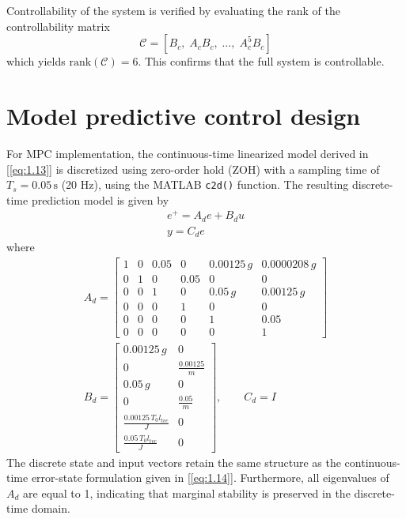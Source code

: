 \documentclass[10pt,twocolumn,twoside]{IEEEtran}
\begin{document}
Controllability of the system is verified by evaluating the rank of the controllability matrix
\begin{equation}
    \mathcal{C} = [B_c,\; A_c B_c,\; \ldots,\; A_c^5 B_c]
\end{equation}
which yields $\mathrm{rank}(\mathcal{C}) = 6$. This confirms that the full system is controllable.

\section{Model predictive control design}
For MPC implementation, the continuous-time linearized model derived in [\ref{eq:1.13}] is discretized using zero-order hold (ZOH) with a sampling time of $T_s = 0.05\,\mathrm{s}$ (20 Hz), using the MATLAB \texttt{c2d()} function. The resulting discrete-time prediction model is given by
\begin{equation}
    \begin{gathered}
        e^{+} = A_d e + B_d u \\
        y = C_d e
    \end{gathered}
    \label{eq:2.1}
\end{equation}
where
\begin{equation}
    \begin{gathered}
         A_d =
        \begin{bmatrix}
        1 & 0 & 0.05 & 0 & 0.00125\,g & 0.0000208\,g \\
        0 & 1 & 0 & 0.05 & 0 & 0 \\
        0 & 0 & 1 & 0 & 0.05\,g & 0.00125\,g \\
        0 & 0 & 0 & 1 & 0 & 0 \\
        0 & 0 & 0 & 0 & 1 & 0.05 \\
        0 & 0 & 0 & 0 & 0 & 1
        \end{bmatrix}\\
        B_d =
        \begin{bmatrix}
        0.00125\,g & 0 \\
        0 & \frac{0.00125}{m} \\
        0.05\,g & 0 \\
        0 & \frac{0.05}{m} \\
        \frac{0.00125\,T_0 l_{tvc}}{J} & 0 \\
        \frac{0.05\,T_0 l_{tvc}}{J} & 0
        \end{bmatrix},
        \qquad
        C_d = I
    \end{gathered}
    \label{eq:2.2}
\end{equation}
The discrete state and input vectors retain the same structure as the continuous-time error-state formulation given in [\ref{eq:1.14}]. Furthermore, all eigenvalues of $A_d$ are equal to 1, indicating that marginal stability is preserved in the discrete-time domain.  
\end{document}
